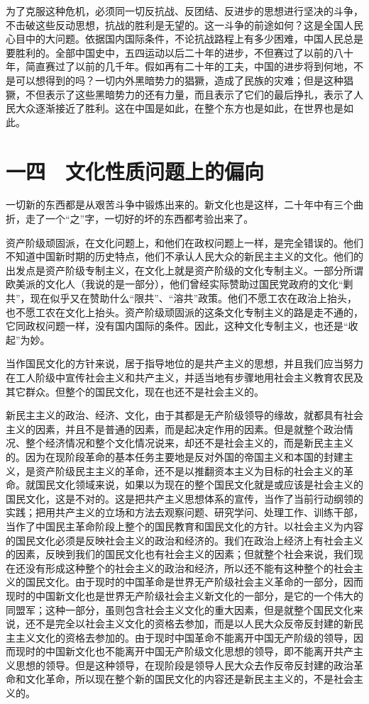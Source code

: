 为了克服这种危机，必须同一切反抗战、反团结、反进步的思想进行坚决的斗争，不击破这些反动思想，抗战的胜利是无望的。这一斗争的前途如何？这是全国人民心目中的大问题。依据国内国际条件，不论抗战路程上有多少困难，中国人民总是要胜利的。全部中国史中，五四运动以后二十年的进步，不但赛过了以前的八十年，简直赛过了以前的几千年。假如再有二十年的工夫，中国的进步将到何地，不是可以想得到的吗？一切内外黑暗势力的猖獗，造成了民族的灾难；但是这种猖獗，不但表示了这些黑暗势力的还有力量，而且表示了它们的最后挣扎，表示了人民大众逐渐接近了胜利。这在中国是如此，在整个东方也是如此，在世界也是如此。

\section{一四　文化性质问题上的偏向}

一切新的东西都是从艰苦斗争中锻炼出来的。新文化也是这样，二十年中有三个曲折，走了一个“之”字，一切好的坏的东西都考验出来了。

资产阶级顽固派，在文化问题上，和他们在政权问题上一样，是完全错误的。他们不知道中国新时期的历史特点，他们不承认人民大众的新民主主义的文化。他们的出发点是资产阶级专制主义，在文化上就是资产阶级的文化专制主义。一部分所谓欧美派的文化人（我说的是一部分），他们曾经实际赞助过国民党政府的文化“剿共”，现在似乎又在赞助什么“限共”、“溶共”政策。他们不愿工农在政治上抬头，也不愿工农在文化上抬头。资产阶级顽固派的这条文化专制主义的路是走不通的，它同政权问题一样，没有国内国际的条件。因此，这种文化专制主义，也还是“收起”为妙。

当作国民文化的方针来说，居于指导地位的是共产主义的思想，并且我们应当努力在工人阶级中宣传社会主义和共产主义，并适当地有步骤地用社会主义教育农民及其它群众。但整个的国民文化，现在也还不是社会主义的。

新民主主义的政治、经济、文化，由于其都是无产阶级领导的缘故，就都具有社会主义的因素，并且不是普通的因素，而是起决定作用的因素。但是就整个政治情况、整个经济情况和整个文化情况说来，却还不是社会主义的，而是新民主主义的。因为在现阶段革命的基本任务主要地是反对外国的帝国主义和本国的封建主义，是资产阶级民主主义的革命，还不是以推翻资本主义为目标的社会主义的革命。就国民文化领域来说，如果以为现在的整个国民文化就是或应该是社会主义的国民文化，这是不对的。这是把共产主义思想体系的宣传，当作了当前行动纲领的实践；把用共产主义的立场和方法去观察问题、研究学问、处理工作、训练干部，当作了中国民主革命阶段上整个的国民教育和国民文化的方针。以社会主义为内容的国民文化必须是反映社会主义的政治和经济的。我们在政治上经济上有社会主义的因素，反映到我们的国民文化也有社会主义的因素；但就整个社会来说，我们现在还没有形成这种整个的社会主义的政治和经济，所以还不能有这种整个的社会主义的国民文化。由于现时的中国革命是世界无产阶级社会主义革命的一部分，因而现时的中国新文化也是世界无产阶级社会主义新文化的一部分，是它的一个伟大的同盟军；这种一部分，虽则包含社会主义文化的重大因素，但是就整个国民文化来说，还不是完全以社会主义文化的资格去参加，而是以人民大众反帝反封建的新民主主义文化的资格去参加的。由于现时中国革命不能离开中国无产阶级的领导，因而现时的中国新文化也不能离开中国无产阶级文化思想的领导，即不能离开共产主义思想的领导。但是这种领导，在现阶段是领导人民大众去作反帝反封建的政治革命和文化革命，所以现在整个新的国民文化的内容还是新民主主义的，不是社会主义的。

